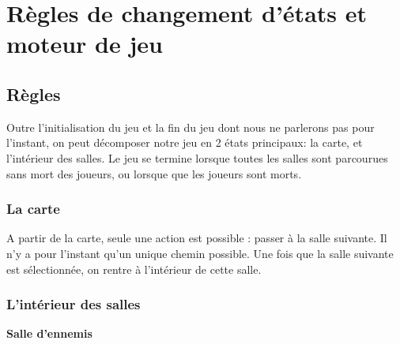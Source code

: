 \section{Règles de changement d'états et moteur de jeu}

\subsection{Règles}
Outre l'initialisation du jeu et la fin du jeu dont nous ne parlerons pas pour l'instant, on peut décomposer notre jeu en 2 états principaux: la carte, et l'intérieur des salles. Le jeu se termine lorsque toutes les salles sont parcourues sans mort des joueurs, ou lorsque que les joueurs sont morts.

\subsubsection{La carte}
A partir de la carte, seule une action est possible : passer à la salle suivante. Il n'y a pour l'instant qu'un unique chemin possible. Une fois que la salle suivante est sélectionnée, on rentre à l'intérieur de cette salle.

\subsubsection{L'intérieur des salles}
\textbf{Salle d'ennemis}

